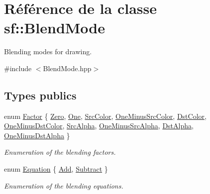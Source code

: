 \hypertarget{structsf_1_1BlendMode}{}\section{Référence de la classe sf\+:\+:Blend\+Mode}
\label{structsf_1_1BlendMode}


Blending modes for drawing.  




{\ttfamily \#include $<$Blend\+Mode.\+hpp$>$}

\subsection*{Types publics}
\begin{DoxyCompactItemize}
\item 
enum \hyperlink{structsf_1_1BlendMode_afb9852caf356b53bb0de460c58a9ebbb}{Factor} \{ \newline
\hyperlink{structsf_1_1BlendMode_afb9852caf356b53bb0de460c58a9ebbbafda2d66c3c3da15cd3b42338fbf6d2ba}{Zero}, 
\hyperlink{structsf_1_1BlendMode_afb9852caf356b53bb0de460c58a9ebbbaa2d3ba8b8bb2233c9d357cbb94bf4181}{One}, 
\hyperlink{structsf_1_1BlendMode_afb9852caf356b53bb0de460c58a9ebbbad679bb0ecaf15c188d7f2e1fab572188}{Src\+Color}, 
\hyperlink{structsf_1_1BlendMode_afb9852caf356b53bb0de460c58a9ebbba5971ffdbca63382058ccba76bfce219e}{One\+Minus\+Src\+Color}, 
\newline
\hyperlink{structsf_1_1BlendMode_afb9852caf356b53bb0de460c58a9ebbba3d85281c3eab7153f2bd9faae3e7523a}{Dst\+Color}, 
\hyperlink{structsf_1_1BlendMode_afb9852caf356b53bb0de460c58a9ebbbac8198db20d14506a841d1091ced1cae2}{One\+Minus\+Dst\+Color}, 
\hyperlink{structsf_1_1BlendMode_afb9852caf356b53bb0de460c58a9ebbbaac0ae68df2930b4d616c3e7abeec7d41}{Src\+Alpha}, 
\hyperlink{structsf_1_1BlendMode_afb9852caf356b53bb0de460c58a9ebbbaab57e8616bf4c21d8ee923178acdf2c8}{One\+Minus\+Src\+Alpha}, 
\newline
\hyperlink{structsf_1_1BlendMode_afb9852caf356b53bb0de460c58a9ebbba5e3dc9a6f117aaa5f7433e1f4662a5f7}{Dst\+Alpha}, 
\hyperlink{structsf_1_1BlendMode_afb9852caf356b53bb0de460c58a9ebbbab4e5c63f189f26075e5939ad1a2ce4e4}{One\+Minus\+Dst\+Alpha}
 \}\begin{DoxyCompactList}\small\item\em Enumeration of the blending factors. \end{DoxyCompactList}
\item 
enum \hyperlink{structsf_1_1BlendMode_a7bce470e2e384c4f9c8d9595faef7c32}{Equation} \{ \hyperlink{structsf_1_1BlendMode_a7bce470e2e384c4f9c8d9595faef7c32a50c081d8f36cf7b77632966e15d38966}{Add}, 
\hyperlink{structsf_1_1BlendMode_a7bce470e2e384c4f9c8d9595faef7c32a14c825be24f8412fc5ed5b49f19bc0d0}{Subtract}
 \}\begin{DoxyCompactList}\small\item\em Enumeration of the blending equations. \end{DoxyCompactList}
\end{DoxyCompactItemize}
